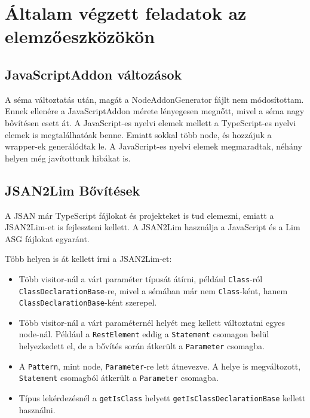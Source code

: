 \chapter{Általam végzett feladatok az elemzőeszközökön}\label{chap:altalam_valtoztatott_programok}

\section{JavaScriptAddon változások}

\noindent


A séma változtatás után, magát a NodeAddonGenerator fájlt nem módosítottam.
Ennek ellenére a JavaScriptAddon mérete lényegesen megnőtt, mivel a séma nagy bővítésen esett át.
A JavaScript-es nyelvi elemek mellett a TypeScript-es nyelvi elemek is megtalálhatóak benne.
Emiatt sokkal több node, és hozzájuk a wrapper-ek generálódtak le.
A JavaScript-es nyelvi elemek megmaradtak, néhány helyen még javítottunk hibákat is.

\section{JSAN2Lim Bővítések}

\noindent

A JSAN már TypeScript fájlokat és projekteket is tud elemezni, emiatt a JSAN2Lim-et is fejleszteni kellett.
A JSAN2Lim használja a JavaScript és a Lim ASG fájlokat egyaránt.

Több helyen is át kellett írni a JSAN2Lim-et:
\begin{itemize}
      \item Több visitor-nál a várt paraméter típusát átírni, például \texttt{Class}-ról \texttt{ClassDeclarationBase}-re,
      mivel a sémában már nem \texttt{Class}-ként, hanem \texttt{ClassDeclarationBase}-ként szerepel.
      \item Több visitor-nál a várt paraméternél helyét meg kellett változtatni egyes node-nál.
      Például a \texttt{RestElement} eddig a \texttt{Statement} csomagon belül helyezkedett el, de a bővítés során átkerült a \texttt{Parameter} csomagba.
      \item A \texttt{Pattern}, mint node, \texttt{Parameter}-re lett átnevezve. A helye is megváltozott, \texttt{Statement} csomagból átkerült a \texttt{Parameter} csomagba.
      \item Típus lekérdezésnél a \texttt{getIsClass} helyett \texttt{getIsClassDeclarationBase} kellett használni.
\end{itemize}

